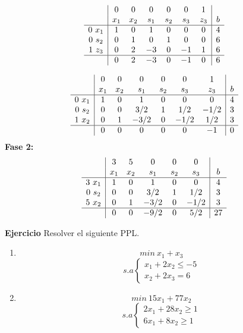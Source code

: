 \documentclass[11pt,fleqn]{book} %
\begin{document}
$$
\begin{array}{c|cccccc|c}
& 0 & 0 & 0 & 0 & 0 & 1 & \\
& x_1 & x_2 & s_1 & s_2 & s_3 & z_3 & b \\ \hline
0 ~ x_1 & 1 & 0 & 1 & 0 & 0 & 0 & 4 \\
0 ~ s_2 & 0 & 1 & 0 & 1 & 0 & 0 & 6 \\
1 ~ z_3 & 0 & 2 & -3 & 0 & -1 & 1 & 6 \\ \hline
& 0 & 2 & -3 & 0 & -1 & 0 & 6
\end{array}
$$

$$
\begin{array}{c|cccccc|c}
& 0 & 0 & 0 & 0 & 0 & 1 & \\
& x_1 & x_2 & s_1 & s_2 & s_3 & z_3 & b \\ \hline
0 ~ x_1 & 1 & 0 & 1 & 0 & 0 & 0 & 4 \\
0 ~ s_2 & 0 & 0 & 3/2 & 1 & 1/2 & -1/2 & 3 \\
1 ~ x_2 & 0 & 1 & -3/2 & 0 & -1/2 & 1/2 & 3 \\ \hline
& 0 & 0 & 0 & 0 & 0 & -1 & 0 
\end{array}
$$
\textbf{Fase 2: }
$$
\begin{array}{c|ccccc|c}
& 3 & 5 & 0 & 0 & 0 & \\
& x_1 & x_2 & s_1 & s_2 & s_3 & b \\ \hline
3 ~ x_1 & 1 & 0 & 1 & 0 & 0 & 4 \\
0 ~ s_2 & 0 & 0 & 3/2 & 1 & 1/2 & 3 \\
5 ~ x_2 & 0 & 1 & -3/2 & 0 & -1/2 & 3 \\ \hline
& 0 & 0 & -9/2 & 0  & 5/2 & 27 
\end{array}
$$

\textbf{Ejercicio} Resolver el siguiente PPL.

\begin{enumerate}
	\item 
	$$min ~x_1 + x_3 $$
	$$s.a \left\{
	\begin{array}{c}
	x_1+2x_2 \leq -5 \\
	x_2 + 2x_3 = 6 
	\end{array}
	\right.
	$$
	\item $$min ~ 15 x_1 + 77 x_2 $$
	$$s.a \left\{
	\begin{array}{c}
	2x_1+28x_2 \geq 1 \\
	6x_1+8x_2 \geq 1
	\end{array}
	\right.
	$$
\end{enumerate}
\end{document}
